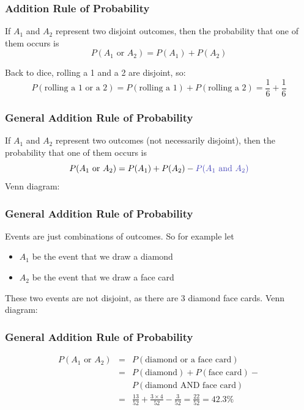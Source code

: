 \documentclass[handout]{beamer}
\newcommand{\blue}[1]{\textcolor{blue2}{#1}}
\begin{document}
\begin{frame}[fragile]
\frametitle{Addition Rule of Probability}
If $A_1$ and $A_2$ represent two disjoint outcomes, then the probability that one of them occurs is
\[
P(A_1 \mbox{ or } A_2) = P(A_1) + P(A_2)
\]

\vspace{0.5cm}

\pause Back to dice, rolling a 1 and a 2 are disjoint, so:
\[
P(\mbox{rolling a 1 or a 2}) = P(\mbox{rolling a 1}) + P(\mbox{rolling a 2}) = \frac{1}{6} + \frac{1}{6}
\]


\end{frame}


\begin{frame}[fragile]
\frametitle{General Addition Rule of Probability}
If $A_1$ and $A_2$ represent two outcomes (not necessarily disjoint), then the probability that one of them occurs is
\[
P(A_1 \mbox{ or } A_2) = P(A_1) + P(A_2) - \blue{P(A_1 \mbox{ and } A_2)}
\]
Venn diagram:
\vspace{4cm}

\end{frame}


\begin{frame}[fragile]
\frametitle{General Addition Rule of Probability}
Events are just combinations of outcomes.  \pause So for example let
\begin{itemize}
\item $A_1$ be the event that we draw a diamond
\item $A_2$ be the event that we draw a face card
\end{itemize}

\pause These two events are not disjoint, as there are 3 diamond face cards.
Venn diagram:
\vspace{3cm}

\end{frame}


\begin{frame}[fragile]
\frametitle{General Addition Rule of Probability}

\begin{eqnarray*}
P(A_1 \mbox{ or } A_2) &=& P(\mbox{diamond or a face card})\\
&=& P(\mbox{diamond}) + P(\mbox{face card}) - \\
&&P(\mbox{diamond AND face card})\\
&=& \frac{13}{52} + \frac{3 \times 4}{52} - \frac{3}{52} = \frac{22}{52} = 42.3\%
\end{eqnarray*}


\end{frame}
\end{document}
